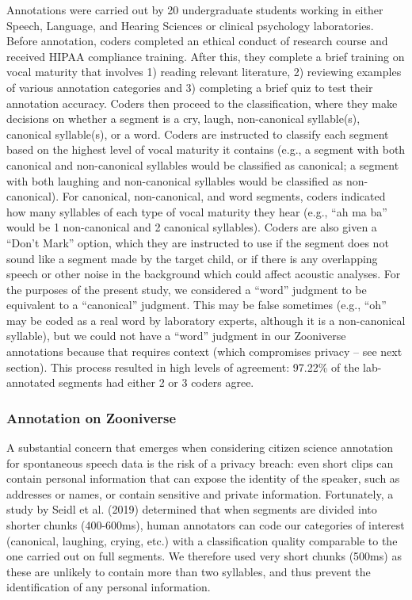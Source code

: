 \documentclass[english,,man,floatsintext]{apa6}
\begin{document}
Annotations were carried out by 20 undergraduate students working in either Speech, Language, and Hearing Sciences or clinical psychology laboratories. Before annotation, coders completed an ethical conduct of research course and received HIPAA compliance training. After this, they complete a brief training on vocal maturity that involves 1) reading relevant literature, 2) reviewing examples of various annotation categories and 3) completing a brief quiz to test their annotation accuracy. Coders then proceed to the classification, where they make decisions on whether a segment is a cry, laugh, non-canonical syllable(s), canonical syllable(s), or a word. Coders are instructed to classify each segment based on the highest level of vocal maturity it contains (e.g., a segment with both canonical and non-canonical syllables would be classified as canonical; a segment with both laughing and non-canonical syllables would be classified as non-canonical). For canonical, non-canonical, and word segments, coders indicated how many syllables of each type of vocal maturity they hear (e.g., \enquote{ah ma ba} would be 1 non-canonical and 2 canonical syllables). Coders are also given a \enquote{Don't Mark} option, which they are instructed to use if the segment does not sound like a segment made by the target child, or if there is any overlapping speech or other noise in the background which could affect acoustic analyses. For the purposes of the present study, we considered a \enquote{word} judgment to be equivalent to a \enquote{canonical} judgment. This may be false sometimes (e.g., \enquote{oh} may be coded as a real word by laboratory experts, although it is a non-canonical syllable), but we could not have a \enquote{word} judgment in our Zooniverse annotations because that requires context (which compromises privacy -- see next section). This process resulted in high levels of agreement: 97.22\% of the lab-annotated segments had either 2 or 3 coders agree.

\hypertarget{annotation-on-zooniverse}{%
\subsubsection{Annotation on Zooniverse}\label{annotation-on-zooniverse}}

A substantial concern that emerges when considering citizen science annotation for spontaneous speech data is the risk of a privacy breach: even short clips can contain personal information that can expose the identity of the speaker, such as addresses or names, or contain sensitive and private information. Fortunately, a study by Seidl et al. (2019) determined that when segments are divided into shorter chunks (400-600ms), human annotators can code our categories of interest (canonical, laughing, crying, etc.) with a classification quality comparable to the one carried out on full segments. We therefore used very short chunks (500ms) as these are unlikely to contain more than two syllables, and thus prevent the identification of any personal information.
\end{document}

